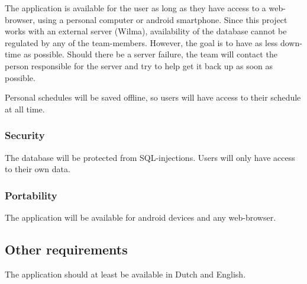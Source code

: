 \documentclass[12pt]{article}
\begin{document}
The application is available for the user as long as they have access to
a web-browser, using a personal computer or android smartphone. Since
this project works with an external server (Wilma), availability of the
database cannot be regulated by any of the team-members. However, the
goal is to have as less down-time as possible. Should there be a server
failure, the team will contact the person responsible for the server and
try to help get it back up as soon as possible.

Personal schedules will be saved offline, so users will have access to
their schedule at all time.

\subsubsection{Security}\label{security}

The database will be protected from SQL-injections. Users will only have
access to their own data.

\subsubsection{Portability}\label{portability}

The application will be available for android devices and any
web-browser.

\subsection{Other requirements}\label{other-requirements}

The application should at least be available in Dutch and English.
\end{document}
